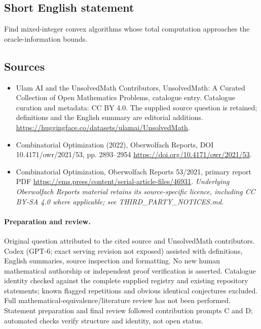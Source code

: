 \documentclass[11pt]{article}
\begin{document}
\subsection{Short English statement}
Find mixed-integer convex algorithms whose total computation approaches the oracle-information bounds.
\subsection{Sources}
\begin{itemize}
\item[\hypertarget{source:statement:1}{S1}] Ulam AI and the UnsolvedMath Contributors, UnsolvedMath: A Curated Collection of Open Mathematics Problems, catalogue entry. Catalogue curation and metadata: CC BY 4.0. The supplied source question is retained; definitions and the English summary are editorial additions.
\url{https://huggingface.co/datasets/ulamai/UnsolvedMath}.
\item[\hypertarget{source:statement:2}{S2}] Combinatorial Optimization (2022), Oberwolfach Reports, DOI 10.4171/owr/2021/53, pp. 2893--2954
\url{https://doi.org/10.4171/owr/2021/53}.
\item[\hypertarget{source:statement:3}{S3}] Combinatorial Optimization, Oberwolfach Reports 53/2021, primary report PDF
\url{https://ems.press/content/serial-article-files/46931}.
\textit{Underlying Oberwolfach Reports material retains its source-specific licence, including CC BY-SA 4.0 where applicable; see THIRD\_PARTY\_NOTICES.md.}
\end{itemize}
\paragraph{Preparation and review.}
Original question attributed to the cited source and UnsolvedMath contributors. Codex (GPT-6; exact serving revision not exposed) assisted with definitions, English summaries, source inspection and formatting. No new human mathematical authorship or independent proof verification is asserted. Catalogue identity checked against the complete supplied registry and existing repository statements; known flagged repetitions and obvious identical conjectures excluded. Full mathematical-equivalence/literature review has not been performed. Statement preparation and final review followed contribution prompts C and D; automated checks verify structure and identity, not open status.
\label{end:statement}
\end{document}

